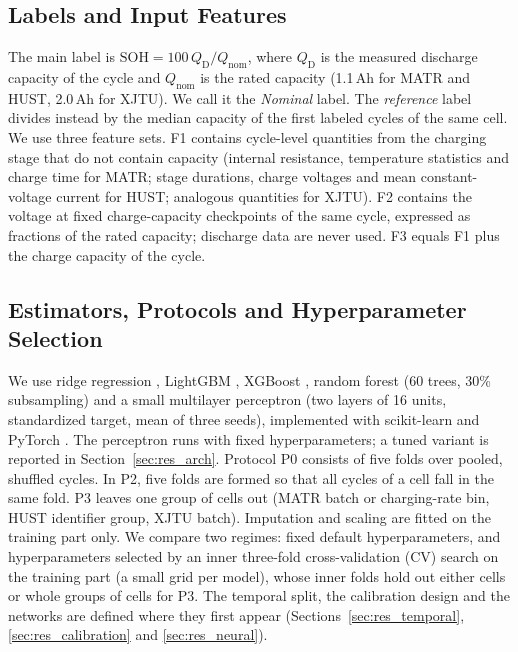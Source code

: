\documentclass{ieeeaccess}
\begin{document}
\subsection{Labels and Input Features}
The main label is $\mathrm{SOH}=100\,Q_\mathrm{D}/Q_\mathrm{nom}$, where $Q_\mathrm{D}$ is the measured discharge capacity of the cycle and $Q_\mathrm{nom}$ is the rated capacity (1.1\,Ah for MATR and HUST, 2.0\,Ah for XJTU). We call it the \textit{Nominal} label. The \textit{reference} label divides instead by the median capacity of the first labeled cycles of the same cell. We use three feature sets. F1 contains cycle-level quantities from the charging stage that do not contain capacity (internal resistance, temperature statistics and charge time for MATR; stage durations, charge voltages and mean constant-voltage current for HUST; analogous quantities for XJTU). F2 contains the voltage at fixed charge-capacity checkpoints of the same cycle, expressed as fractions of the rated capacity; discharge data are never used. F3 equals F1 plus the charge capacity of the cycle.

\subsection{Estimators, Protocols and Hyperparameter Selection}
We use ridge regression \cite{hoerl1970}, LightGBM \cite{ke2017}, XGBoost \cite{chen2016}, random forest \cite{breiman2001} (60 trees, 30\% subsampling) and a small multilayer perceptron (two layers of 16 units, standardized target, mean of three seeds), implemented with scikit-learn \cite{pedregosa2011} and PyTorch \cite{paszke2019}. The perceptron runs with fixed hyperparameters; a tuned variant is reported in Section~\ref{sec:res_arch}. Protocol P0 consists of five folds over pooled, shuffled cycles. In P2, five folds are formed so that all cycles of a cell fall in the same fold. P3 leaves one group of cells out (MATR batch or charging-rate bin, HUST identifier group, XJTU batch). Imputation and scaling are fitted on the training part only. We compare two regimes: fixed default hyperparameters, and hyperparameters selected by an inner three-fold cross-validation (CV) search on the training part (a small grid per model), whose inner folds hold out either cells or whole groups of cells for P3. The temporal split, the calibration design and the networks are defined where they first appear (Sections~\ref{sec:res_temporal}, \ref{sec:res_calibration} and \ref{sec:res_neural}).
\end{document}
